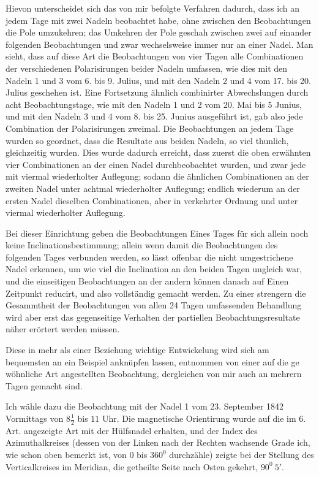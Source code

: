 Hievon unterscheidet sich das von mir befolgte Verfahren dadurch, dass ich an jedem Tage mit zwei Nadeln beobachtet habe, ohne zwischen den Beobachtungen die Pole umzukehren; das Umkehren der Pole geschah zwischen zwei auf einander folgenden Beobachtungen und zwar wechselsweise immer nur an einer Nadel. Man sieht, dass auf diese Art die Beobachtungen von vier Tagen alle Combinationen der verschiedenen Polarisirungen beider Nadeln umfassen, wie dies mit den Nadeln 1 und 3 vom 6. bis 9. Julius, und mit den Nadeln 2 und 4 vom 17. bis 20. Julius geschehen ist. Eine Fortsetzung ähnlich combinirter Abwechslungen durch acht Beobachtungstage, wie mit den Nadeln 1 und 2 vom 20. Mai bis 5 Junius, und mit den Nadeln 3 und 4 vom 8. bis 25. Junius ausgeführt ist, gab also jede Combination der Polarisirungen zweimal. Die Beobachtungen an jedem Tage wurden so geordnet, dass die Resultate aus beiden Nadeln, so viel thunlich, gleichzeitig wurden. Dies wurde dadurch erreicht, dass zuerst die oben erwähnten vier Combinationen an der einen Nadel durchbeobachtet wurden, und zwar jede mit viermal wiederholter Auflegung; sodann die ähnlichen Combinationen an der zweiten Nadel unter achtmal wiederholter Auflegung; endlich wiederum an der ersten Nadel dieselben Combinationen, aber in verkehrter Ordnung und unter viermal wiederholter Auflegung.

Bei dieser Einrichtung geben die Beobachtungen Eines Tages für sich allein noch keine Inclinationsbestimmung; allein wenn damit die Beobachtungen des folgenden Tages verbunden werden, so lässt offenbar die nicht umgestrichene Nadel erkennen, um wie viel die Inclination an den beiden Tagen ungleich war, und die einseitigen Beobachtungen an der andern können danach auf Einen Zeitpunkt reducirt, und also vollständig gemacht werden. Zu einer strengern die Gesammtheit der Beobachtungen von allen 24 Tagen umfassenden Behandlung wird aber erst das gegenseitige Verhalten der partiellen Beobachtungsresultate näher erörtert werden müssen.

Diese in mehr als einer Beziehung wichtige Entwickelung wird sich am bequemsten an ein Beispiel anknüpfen lassen, entnommen von einer auf die ge%
%
wöhnliche Art angestellten Beobachtung, dergleichen von mir auch an mehrern Tagen gemacht sind.

Ich wähle dazu die Beobachtung mit der Nadel 1 vom 23. September 1842 Vormittags von $8\frac{1}{2}$ bis $11$ Uhr. Die magnetische Orientirung wurde auf die im 6. Art. angezeigte Art mit der Hülfsnadel erhalten, und der Index des Azimuthalkreises (dessen von der Linken nach der Rechten wachsende Grade ich, wie schon oben bemerkt ist, von $0$ bis $360^0$ durchzähle) zeigte bei der Stellung des Verticalkreises im Meridian, die getheilte Seite nach Osten gekehrt, $90^0\ 5'$.

